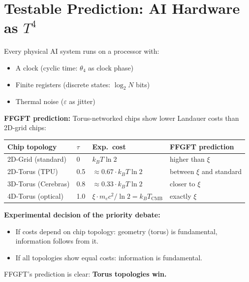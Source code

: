\section{Testable Prediction: AI Hardware as $T^4$}

Every physical AI system runs on a processor with:
\begin{itemize}
  \item A clock (cyclic time: $\theta_4$ as clock phase)
  \item Finite registers (discrete states: $\log_2 N$ bits)
  \item Thermal noise ($\varepsilon$ as jitter)
\end{itemize}

\textbf{FFGFT prediction:} Torus-networked chips show lower Landauer costs
than 2D-grid chips:

\begin{center}
\renewcommand{\arraystretch}{1.3}
{\small
\begin{tabular}{p{3.5cm}p{1.5cm}p{3cm}p{4cm}}
\toprule
\textbf{Chip topology} & $\tau$ & \textbf{Exp.\ cost} & \textbf{FFGFT prediction} \\
\midrule
2D-Grid (standard) & 0 & $k_BT\ln 2$ & higher than $\xi$ \\
2D-Torus (TPU) & 0.5 & $\approx 0.67\cdot k_BT\ln 2$ & between $\xi$ and standard \\
3D-Torus (Cerebras) & 0.8 & $\approx 0.33\cdot k_BT\ln 2$ & closer to $\xi$ \\
4D-Torus (optical) & 1.0 & $\xi\cdot m_ec^2/\ln 2 = k_BT_\text{CMB}$ & exactly $\xi$ \\
\bottomrule
\end{tabular}
}
\end{center}

\textbf{Experimental decision of the priority debate:}
\begin{itemize}
  \item If costs depend on chip topology: geometry (torus) is fundamental,
        information follows from it.
  \item If all topologies show equal costs: information is fundamental.
\end{itemize}

FFGFT's prediction is clear: \textbf{Torus topologies win.}


